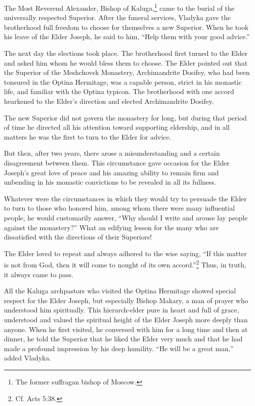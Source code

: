 The Most Reverend Alexander, Bishop of Kaluga,\footnote{The former suffragan bishop of Moscow.} came to the burial of the universally respected Superior. After the funeral services, Vladyka gave the brotherhood full freedom to choose for themselves a new Superior. When he took his leave of the Elder Joseph, he said to him, “Help them with your good advice.”

The next day the elections took place. The brotherhood first turned to the Elder and asked him whom he would bless them to choose. The Elder pointed out that the Superior of the Meshchovsk Monastery, Archimandrite Dosifey, who had been tonsured in the Optina Hermitage, was a capable person, strict in his monastic life, and familiar with the Optina typicon. The brotherhood with one accord hearkened to the Elder's direction and elected Archimandrite Dosifey.

The new Superior did not govern the monastery for long, but during that period of time he directed all his attention toward supporting eldership, and in all matters he was the first to turn to the Elder for advice.

But then, after two years, there arose a misunderstanding and a certain disagreement between them. This circumstance gave occasion for the Elder Joseph's great love of peace and his amazing ability to remain firm and unbending in his monastic convictions to be revealed in all its fullness.

Whatever were the circumstances in which they would try to persuade the Elder to turn to those who honored him, among whom there were many influential people, he would customarily answer, “Why should I write and arouse lay people against the monastery?” What an edifying lesson for the many who are dissatisfied with the directions of their Superiors!

The Elder loved to repeat and always adhered to the wise saying, “If this matter is not from God, then it will come to nought of its own accord.''\footnote{Cf. Acts 5:38.} Thus, in truth, it always came to pass.

All the Kaluga archpastors who visited the Optina Hermitage showed special respect for the Elder Joseph, but especially Bishop Makary, a man of prayer who understood him spiritually. This hierarch-elder pure in heart and full of grace, understood and valued the spiritual height of the Elder Joseph more deeply than anyone. When he first visited, he conversed with him for a long time and then at dinner, he told the Superior that he liked the Elder very much and that he had made a profound impression by his deep humility. “He will be a great man,” added Vladyka.

